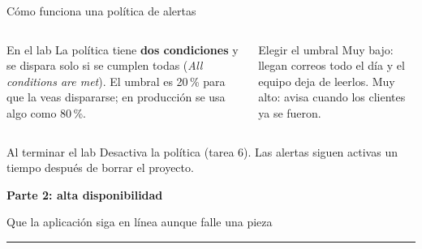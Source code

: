 \documentclass[aspectratio=169,10pt,c]{beamer}
\newcommand{\separador}[2]{%
\begin{frame}[plain]
\vfill
\begin{center}
{\fontsize{29}{34}\selectfont\bfseries #1}\par
\vspace{2mm}
{\small #2}\par
\vspace{4mm}
{\color{utpRojo}\rule{8.5cm}{1.2pt}}
\end{center}
\vfill
\end{frame}}
\begin{document}
\begin{frame}{Cómo funciona una política de alertas}
\begin{center}
\end{center}
\vspace{2mm}
\begin{columns}[T,onlytextwidth]
\begin{block}{En el lab}
\small La política tiene \textbf{dos condiciones} y se dispara solo si se cumplen todas (\textit{All conditions are met}). El umbral es 20\,\% para que la veas dispararse; en producción se usa algo como 80\,\%.
\end{block}
\begin{block}{Elegir el umbral}
\small Muy bajo: llegan correos todo el día y el equipo deja de leerlos. Muy alto: avisa cuando los clientes ya se fueron.
\end{block}
\end{columns}
\par\vspace{2mm}
\begin{alertblock}{Al terminar el lab}
\small Desactiva la política (tarea 6). Las alertas siguen activas un tiempo después de borrar el proyecto.
\end{alertblock}
\end{frame}

\separador{Parte 2: alta disponibilidad}{Que la aplicación siga en línea aunque falle una pieza}
\end{document}
